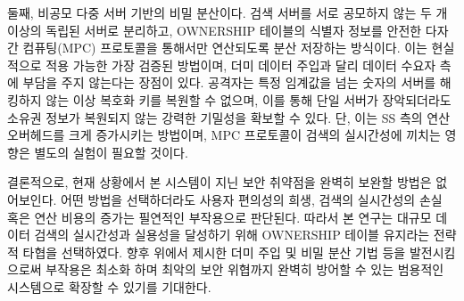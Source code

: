 \bigskip

둘째, 비공모 다중 서버 기반의 비밀 분산이다. 검색 서버를 서로 공모하지 않는 두 개 이상의 독립된 서버로 분리하고, OWNERSHIP 테이블의 식별자 정보를 안전한 다자간 컴퓨팅(MPC) 프로토콜을 통해서만 연산되도록 분산 저장하는 방식이다. 이는 현실적으로 적용 가능한 가장 검증된 방법이며, 더미 데이터 주입과 달리 데이터 수요자 측에 부담을 주지 않는다는 장점이 있다. 공격자는 특정 임계값을 넘는 숫자의 서버를 해킹하지 않는 이상 복호화 키를 복원할 수 없으며, 이를 통해 단일 서버가 장악되더라도 소유권 정보가 복원되지 않는 강력한 기밀성을 확보할 수 있다. 단, 이는 SS 측의 연산 오버헤드를 크게 증가시키는 방법이며, MPC 프로토콜이 검색의 실시간성에 끼치는 영향은 별도의 실험이 필요할 것이다.

\bigskip

결론적으로, 현재 상황에서 본 시스템이 지닌 보안 취약점을 완벽히 보완할 방법은 없어보인다. 어떤 방법을 선택하더라도 사용자 편의성의 희생, 검색의 실시간성의 손실 혹은 연산 비용의 증가는 필연적인 부작용으로 판단된다. 따라서 본 연구는 대규모 데이터 검색의 실시간성과 실용성을 달성하기 위해 OWNERSHIP 테이블 유지라는 전략적 타협을 선택하였다. 향후 위에서 제시한 더미 주입 및 비밀 분산 기법 등을 발전시킴으로써 부작용은 최소화 하며 최악의 보안 위협까지 완벽히 방어할 수 있는 범용적인 시스템으로 확장할 수 있기를 기대한다.
